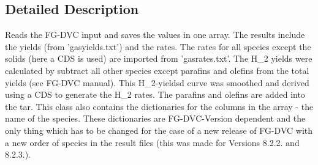 \subsection{\-Detailed \-Description}
\begin{DoxyVerb}Reads the FG-DVC input and saves the values in one array. The results include the yields (from 'gasyields.txt') and the rates. The rates for all species except the solids (here a CDS is used) are imported from 'gasrates.txt'. The H_2 yields were calculated by subtract all other species except parafins and olefins from the total yields (see FG-DVC manual). This H_2-yieldsd curve was smoothed and derived using a CDS to generate the H_2 rates. The parafins and olefins are added into the tar. This class also contains the dictionaries for the columns in the array - the name of the species. These dictionaries are FG-DVC-Version dependent and the only thing which has to be changed for the case of a new release of FG-DVC with a new order of species in the result files (this was made for Versions 8.2.2. and 8.2.3.).\end{DoxyVerb}
 

